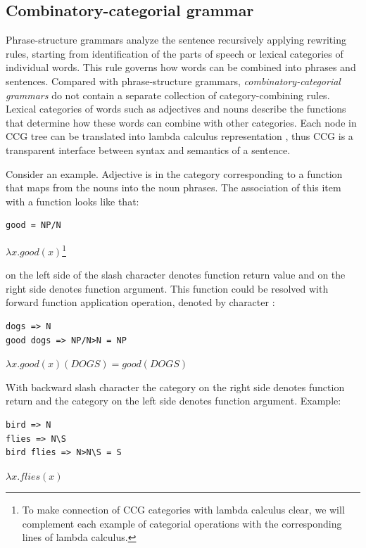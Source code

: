 \subsection{Combinatory-categorial grammar}
Phrase-structure grammars analyze the sentence recursively applying rewriting rules, starting from identification of the parts of speech or lexical categories of individual words. This rule governs how words can be combined into phrases and sentences. Compared with phrase-structure grammars, \emph{combinatory-ca\-te\-go\-rial grammars} do not contain a separate collection of category-combining rules. Lexical categories of words such as adjectives and nouns describe the functions that determine how these words can combine with other categories. Each node in CCG tree can be translated into lambda calculus representation \parencite{artzi2013}, thus CCG is a transparent interface between syntax and semantics of a sentence.

Consider an example. Adjective  is in the category corresponding to a function that maps from the nouns into the noun phrases. The association of this item with a function looks like that:

\begin{verbatim}
good = NP/N 
\end{verbatim}

$\lambda x.good(x)$\footnote{To make connection of CCG categories with lambda calculus clear, we will complement each example of categorial operations with the corresponding lines of lambda calculus.}

 on the left side of the slash character denotes function return value and  on the right side denotes function argument. This function could be resolved with forward function application operation, denoted by character \code{>}:

\begin{verbatim}
dogs => N
good dogs => NP/N>N = NP
\end{verbatim}

$\lambda x.good(x)(DOGS)=good(DOGS)$

With backward slash character \code{\textbackslash} the category on the right side denotes function return and the category on the left side denotes function argument. Example:

\begin{verbatim}
bird => N
flies => N\S
bird flies => N>N\S = S
\end{verbatim}

$\lambda x.flies(x)$

